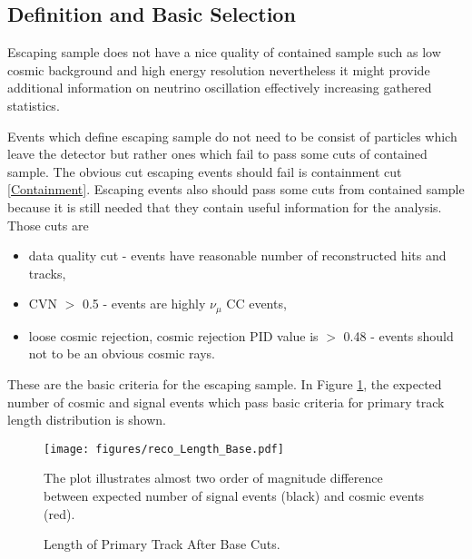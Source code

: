 \subsection{Definition and Basic Selection} \label{base_cut}
Escaping sample does not have a nice quality of contained sample such as low cosmic background and
high energy resolution nevertheless it might provide additional information on neutrino oscillation
effectively increasing gathered statistics. 

Events which define escaping sample do not need to be consist of particles which leave the detector but
rather ones which fail to pass some cuts of contained sample. The obvious cut escaping events should 
fail is containment cut \ref{Containment}. Escaping events also should pass some cuts from contained 
sample because it is still needed that they contain useful information for the analysis. Those cuts are
\begin{itemize}
\item data quality cut - events have reasonable number of reconstructed hits and tracks,
\item CVN $>$ 0.5 - events are highly $\nu_\mu$ CC events,
\item loose cosmic rejection, cosmic rejection PID value is $>$ 0.48 - events should not to be an obvious 
cosmic rays.
\end{itemize}

These are the basic criteria for the escaping sample. In Figure \ref{fig:length_1}, the
expected number of cosmic and signal events which pass basic criteria for primary track length
distribution is shown.
\begin{figure}[h]
\centering
\texttt{[image: figures/reco\_Length\_Base.pdf]}
\caption{Length of Primary Track After Base Cuts.}
{The plot illustrates almost two order of magnitude difference between expected number of signal events 
(black) and cosmic events (red). }
\label{fig:length_1}
\end{figure}

